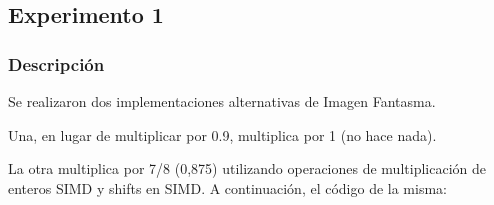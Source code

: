 \subsection{Experimento 1}
\subsubsection{Descripción}

\par Se realizaron dos implementaciones alternativas de Imagen Fantasma.
\par Una, en lugar de multiplicar por 0.9, multiplica por 1 (no hace nada).
\par La otra multiplica por 7/8 (0,875) utilizando operaciones de multiplicación de enteros SIMD y shifts en SIMD. A continuación, el código de la misma:

